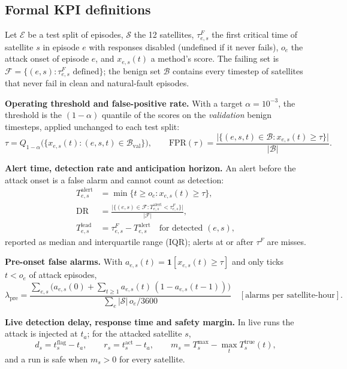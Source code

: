 \documentclass[10pt,a4paper]{article}
\begin{document}
\subsection{Formal KPI definitions}
Let $\mathcal{E}$ be a test split of episodes, $\mathcal{S}$ the 12 satellites, $\tau^F_{e,s}$ the
first critical time of satellite $s$ in episode $e$ with responses disabled (undefined if it never
fails), $o_e$ the attack onset of episode $e$, and $x_{e,s}(t)$ a method's score. The failing set is
$\mathcal{F}=\{(e,s):\tau^F_{e,s}\text{ defined}\}$; the benign set $\mathcal{B}$ contains every
timestep of satellites that never fail in clean and natural-fault episodes.

\textbf{Operating threshold and false-positive rate.} With a target $\alpha=10^{-3}$, the threshold is
the $(1-\alpha)$ quantile of the scores on the \emph{validation} benign timesteps, applied unchanged to
each test split:
\begin{equation}
\tau = Q_{1-\alpha}\big(\{x_{e,s}(t):(e,s,t)\in\mathcal{B}_{\mathrm{val}}\}\big),\qquad
\mathrm{FPR}(\tau) = \frac{\big|\{(e,s,t)\in\mathcal{B}: x_{e,s}(t)\ge\tau\}\big|}{|\mathcal{B}|}.
\label{eq:fpr}
\end{equation}

\textbf{Alert time, detection rate and anticipation horizon.} An alert before the attack onset is a
false alarm and cannot count as detection:
\begin{align}
T^{\mathrm{alert}}_{e,s} &= \min\{t\ge o_e : x_{e,s}(t)\ge\tau\}, \label{eq:alert}\\
\mathrm{DR} &= \frac{\big|\{(e,s)\in\mathcal{F} : T^{\mathrm{alert}}_{e,s}<\tau^F_{e,s}\}\big|}{|\mathcal{F}|},
\label{eq:dr}\\
T^{\mathrm{lead}}_{e,s} &= \tau^F_{e,s}-T^{\mathrm{alert}}_{e,s}\quad\text{for detected }(e,s),
\label{eq:lead}
\end{align}
reported as median and interquartile range (IQR); alerts at or after $\tau^F$ are misses.

\textbf{Pre-onset false alarms.} With $a_{e,s}(t)=\mathbf{1}[x_{e,s}(t)\ge\tau]$ and only ticks
$t<o_e$ of attack episodes,
\begin{equation}
\lambda_{\mathrm{pre}} = \frac{\sum_{e,s}\big(a_{e,s}(0)+\sum_{t\ge1}a_{e,s}(t)\,(1-a_{e,s}(t-1))\big)}
{\sum_{e} |\mathcal{S}|\,o_e/3600}\quad[\text{alarms per satellite-hour}].
\label{eq:preonset}
\end{equation}

\textbf{Live detection delay, response time and safety margin.} In live runs the attack is injected
at $t_a$; for the attacked satellite $s$,
\begin{equation}
d_s = t^{\mathrm{flag}}_s - t_a,\qquad r_s = t^{\mathrm{act}}_s - t_a,\qquad
m_s = T^{\max}_s - \max_t T^{\mathrm{true}}_s(t),
\label{eq:live}
\end{equation}
and a run is safe when $m_s>0$ for every satellite.
\end{document}
